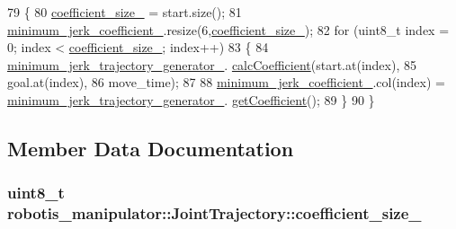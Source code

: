 \begin{DoxyCode}
79 \{
80   \hyperlink{classrobotis__manipulator_1_1_joint_trajectory_abfc3d7ff3a5789f818ce2a483118458a}{coefficient\_size\_} = start.size();
81   \hyperlink{classrobotis__manipulator_1_1_joint_trajectory_a74b431132c75c6840b70ea62f65d3c48}{minimum\_jerk\_coefficient\_}.resize(6,\hyperlink{classrobotis__manipulator_1_1_joint_trajectory_abfc3d7ff3a5789f818ce2a483118458a}{coefficient\_size\_});
82   \textcolor{keywordflow}{for} (uint8\_t index = 0; index < \hyperlink{classrobotis__manipulator_1_1_joint_trajectory_abfc3d7ff3a5789f818ce2a483118458a}{coefficient\_size\_}; index++)
83   \{
84     \hyperlink{classrobotis__manipulator_1_1_joint_trajectory_a7138717ca5cd53ca07e3ff9c68494170}{minimum\_jerk\_trajectory\_generator\_}.
      \hyperlink{classrobotis__manipulator_1_1_minimum_jerk_afd29204e588525a2688a74d2a9656354}{calcCoefficient}(start.at(index),
85                                     goal.at(index),
86                                     move\_time);
87 
88     \hyperlink{classrobotis__manipulator_1_1_joint_trajectory_a74b431132c75c6840b70ea62f65d3c48}{minimum\_jerk\_coefficient\_}.col(index) = 
      \hyperlink{classrobotis__manipulator_1_1_joint_trajectory_a7138717ca5cd53ca07e3ff9c68494170}{minimum\_jerk\_trajectory\_generator\_}.
      \hyperlink{classrobotis__manipulator_1_1_minimum_jerk_a1610599c85567422e492e0893e02cc34}{getCoefficient}();
89   \}
90 \}
\end{DoxyCode}


\subsection{Member Data Documentation}
\subsubsection[{\texorpdfstring{coefficient\+\_\+size\+\_\+}{coefficient_size_}}]{\setlength{\rightskip}{0pt plus 5cm}uint8\+\_\+t robotis\+\_\+manipulator\+::\+Joint\+Trajectory\+::coefficient\+\_\+size\+\_\+\hspace{0.3cm}{\ttfamily [private]}}\hypertarget{classrobotis__manipulator_1_1_joint_trajectory_abfc3d7ff3a5789f818ce2a483118458a}{}\label{classrobotis__manipulator_1_1_joint_trajectory_abfc3d7ff3a5789f818ce2a483118458a}


